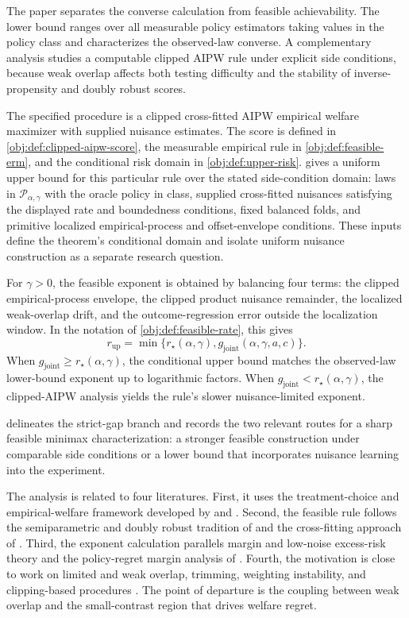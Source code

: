 The paper separates the converse calculation from feasible achievability.  The lower bound ranges over all measurable policy estimators taking values in the policy class and characterizes the observed-law converse.  A complementary analysis studies a computable clipped AIPW rule under explicit side conditions, because weak overlap affects both testing difficulty and the stability of inverse-propensity and doubly robust scores.

The specified procedure is a clipped cross-fitted AIPW empirical welfare maximizer with supplied nuisance estimates.  The score is defined in \cref{obj:def:clipped-aipw-score}, the measurable empirical rule in \cref{obj:def:feasible-erm}, and the conditional risk domain in \cref{obj:def:upper-risk}.   gives a uniform upper bound for this particular rule over the stated side-condition domain: laws in \(\mathcal P_{\alpha,\gamma}\) with the oracle policy in class, supplied cross-fitted nuisances satisfying the displayed rate and boundedness conditions, fixed balanced folds, and primitive localized empirical-process and offset-envelope conditions.  These inputs define the theorem's conditional domain and isolate uniform nuisance construction as a separate research question.

For \(\gamma>0\), the feasible exponent is obtained by balancing four terms: the clipped empirical-process envelope, the clipped product nuisance remainder, the localized weak-overlap drift, and the outcome-regression error outside the localization window.  In the notation of \cref{obj:def:feasible-rate}, this gives
\[
r_{\mathrm{up}}
=
\min\{r_\star(\alpha,\gamma),g_{\mathrm{joint}}(\alpha,\gamma,a,c)\}.
\]
When \(g_{\mathrm{joint}}\ge r_\star(\alpha,\gamma)\), the conditional upper bound matches the observed-law lower-bound exponent up to logarithmic factors.  When \(g_{\mathrm{joint}}<r_\star(\alpha,\gamma)\), the clipped-AIPW analysis yields the rule's slower nuisance-limited exponent.

 delineates the strict-gap branch and records the two relevant routes for a sharp feasible minimax characterization: a stronger feasible construction under comparable side conditions or a lower bound that incorporates nuisance learning into the experiment.

The analysis is related to four literatures.  First, it uses the treatment-choice and empirical-welfare framework developed by \citet{Manski2004,Manski2009,Stoye2009} and \citet{Kitagawa2018}.  Second, the feasible rule follows the semiparametric and doubly robust tradition of \citet{Robins1994,Hahn1998,Hirano2003,Newey1994,Bickel1993,VanDerLaan2011} and the cross-fitting approach of \citet{Chernozhukov2018,Chernozhukov2022}.  Third, the exponent calculation parallels margin and low-noise excess-risk theory \citep{Audibert2007,Massart2006,Tsybakov2009} and the policy-regret margin analysis of \citet{Luedtke2017}.  Fourth, the motivation is close to work on limited and weak overlap, trimming, weighting instability, and clipping-based procedures \citep{Li2016,DAmour2017,BenMichael2022,Hill2024,Susmann2025,Zhao2023,Liu2026}.  The point of departure is the coupling between weak overlap and the small-contrast region that drives welfare regret.

